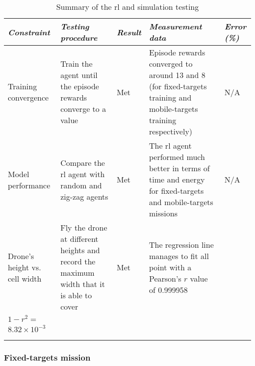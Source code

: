 \documentclass[../main.tex]{subfiles}
\begin{document}
\begin{table}[H]
    \centering
    \caption{Summary of the \gls{rl} and simulation testing}
    \label{tab:rl-testing-summary}
    \begin{tabularx}{\textwidth}{ X X l X l }
        \toprule
        \textit{Constraint} 
            & \textit{Testing procedure} 
                & \textit{Result}
        & \textit{Measurement data} 
            & \textit{Error (\%)} \\

        \midrule
        
        
        \raggedright Training convergence    
            & Train the agent until the episode rewards converge to a
            value
        & Met
        & Episode rewards converged to around 13 and 8 (for fixed-targets training
        and mobile-targets training respectively)
        & N/A \\
        \addlinespace

        \raggedright Model performance
        & Compare the \gls{rl} agent with random and zig-zag agents
        & Met
        & The \gls{rl} agent performed much better in terms of time
        and energy for fixed-targets and mobile-targets missions
        & N/A \\
        \addlinespace

        \raggedright Drone's height vs. cell width
        & Fly the drone at different heights and record the maximum
        width that it is able to cover
        & Met
        & The regression line manages to fit all point with a
        Pearson's $r$ value of 0.999958
        & 
        \begin{tabular}{l}
            \\
            $1-r^2 =$ \\
            $8.32\times 10^{-3}$ \\
        \end{tabular}
        \\
        \addlinespace

        \bottomrule		
    \end{tabularx}
\end{table}

\subsubsection{Fixed-targets mission}
\end{document}
